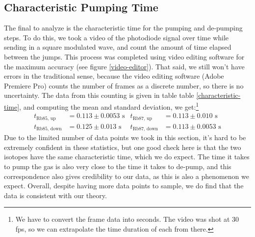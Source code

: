 \documentclass[10pt]{article}
\begin{document}
	\subsection{Characteristic Pumping Time}
	The final to analyze is the characteristic time for the pumping and de-pumping
	steps. To do this, we took a video of the photodiode signal over time while
	sending in a square modulated wave, and count the amount of time elapsed between
	the jumps. This process was completed using video editing software for the
	maximum accuracy (see figure \ref{video-editor}). That said, we still won't have
	errors in the traditional sense, because the video editing software (Adobe
	Premiere Pro) counts the number of frames as a discrete number, so there is no
	uncertainty. The data from this counting is given in table 
	table \ref{characteristic-time}, and computing the mean and standard deviation,
	we get:\footnote{We have to convert the frame data into seconds. The video was
	shot at 30 fps, so we can extrapolate the time duration of each from there.}   
	\begin{align*}
		t_\text{Rb85, up} &= 0.113 \pm 0.0053 \text{ s} & t_\text{Rb87, up} &= 0.113
		\pm 0.010 \text{ s} \\ 
		t_\text{Rb85, down} &= 0.125 \pm 0.013 \text{ s} & t_\text{Rb87, down} &=
		0.113 \pm 0.0053 \text{ s} 
	\end{align*}
	Due to the limited number of data points we took in this section, it's hard to be
	extremely confident in these statistics, but one good check here is that the two
	isotopes have the same characteristic time, which we do expect. The time it takes
	to pump the gas is also very close to the time it takes to de-pump, and this
	correspondence also gives credibility to our data, as this is also a phenomenon
	we expect. Overall, despite having more data points to sample, we do find that
	the data is consistent with our theory.  
\end{document}
